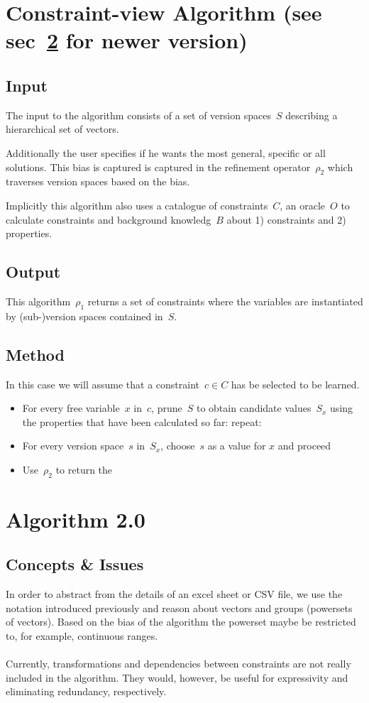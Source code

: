 \documentclass[a4paper]{article}
\begin{document}
{\color{gray}
\section{Constraint-view Algorithm (see sec~\ref{sec:algorithm2.0} for newer version)}

\subsection{Input}
The input to the algorithm consists of a set of version spaces~$S$ describing a hierarchical set of vectors.

Additionally the user specifies if he wants the most general, specific or all solutions.
This bias is captured is captured in the refinement operator~$\rho_2$ which traverses version spaces based on the bias.

Implicitly this algorithm also uses a catalogue of constraints~$C$, an oracle~$O$ to calculate constraints and background knowledg~$B$ about 1) constraints and 2) properties.

\subsection{Output}
This algorithm~$\rho_1$ returns a set of constraints where the variables are instantiated by (sub-)version spaces contained in~$S$.

\subsection{Method}
In this case we will assume that a constraint~$c \in C$ has be selected to be learned.

\begin{itemize}
 	\item For every free variable~$x$ in~$c$, prune~$S$ to obtain candidate values~$S_x$ using the properties that have been calculated so far: repeat:
 	\item For every version space~$s$ in~$S_x$, choose~$s$ as a value for $x$ and proceed
 	\item Use~$\rho_2$ to return the 
 \end{itemize}
}

\section{Algorithm 2.0}
\label{sec:algorithm2.0}

\subsection{Concepts \& Issues}
In order to abstract from the details of an excel sheet or CSV file, we use the notation introduced previously and reason about vectors and groups (powersets of vectors).
Based on the bias of the algorithm the powerset maybe be restricted to, for example, continuous ranges.
\\\\
Currently, transformations and dependencies between constraints are not really included in the algorithm.
They would, however, be useful for expressivity and eliminating redundancy, respectively.
\end{document}
